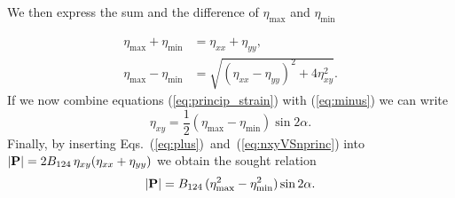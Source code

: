We then express the sum and the difference of $\eta_\mathrm{max}$ and $\eta_\mathrm{min}$
%

\begin{align}
\eta_{\mathrm{max}}+\eta_{\mathrm{min}} &= \eta_{xx}+\eta_{yy}, \label{eq:plus}\\
\eta_{\mathrm{max}}-\eta_{\mathrm{min}} &= \sqrt{\left(\eta_{xx}-\eta_{yy}\right)^2+4\eta_{xy}^2}.\label{eq:minus}
\end{align}
%
If we now combine equations (\ref{eq:princip_strain}) with (\ref{eq:minus}) we can write
%
%
%
\begin{equation}
\label{eq:nxyVSnprinc}
\eta_{xy}=\frac{1}{2}\left(\eta_{\mathrm{max}}-\eta_{\mathrm{min}}\right)\sin{2\alpha}.
\end{equation}
%
Finally, by inserting Eqs.~(\ref{eq:plus})~and~(\ref{eq:nxyVSnprinc}) into $|{\bf P}|=2B_{124}\,\eta_{xy}(\eta_{xx}+\eta_{yy})$ we obtain the sought relation
%
\begin{equation}
|{\bf P}|=B_{124}\,(\eta^2_{\mathrm{max}}-\eta^2_{\mathrm{min}})\sin2\alpha.
\end{equation}


\newpage 